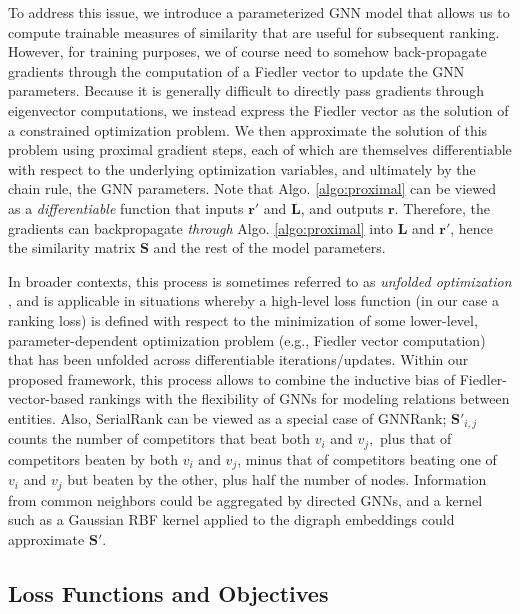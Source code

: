 \documentclass[nohyperref]{article}
\theoremstyle{plain}
\theoremstyle{definition}
\theoremstyle{remark}
\begin{document}
To address this issue, we introduce a parameterized GNN model that allows us to compute trainable measures of similarity that are useful for subsequent ranking. However, for training purposes, we of course need to somehow back-propagate gradients through the computation of a Fiedler vector to update the GNN parameters.  Because it is generally difficult to directly pass gradients through eigenvector computations, we instead express the Fiedler vector as the solution of a constrained optimization problem.  We then approximate the solution of this problem using proximal gradient steps, each of which are themselves differentiable with respect to the underlying optimization variables, and ultimately by the chain rule, the GNN parameters. Note that Algo. \ref{algo:proximal} can be viewed as a \emph{differentiable} function that inputs $\mathbf{r}'$ and $\mathbf{L}$, and outputs $\mathbf{r}$.  Therefore, the gradients can backpropagate \emph{through} Algo. \ref{algo:proximal} into 
$\mathbf{L}$ and $\mathbf{r}'$, hence the similarity matrix $\mathbf{S}$ and the rest of the model parameters.

In broader contexts, this process is sometimes referred to as \textit{unfolded optimization}  \cite{gregor2010learning}, and is applicable in situations whereby a high-level loss function (in our case a ranking loss) is defined with respect to the minimization of some lower-level, parameter-dependent optimization problem (e.g., Fiedler vector computation) that has been unfolded across differentiable iterations/updates. Within our proposed framework, this process allows to combine the inductive bias of Fiedler-vector-based rankings with the flexibility of GNNs for modeling relations between entities. Also, SerialRank can be viewed as a special case of GNNRank;
$\mathbf{S}'_{i,j}$ counts the number of competitors that beat both $v_i$ and $v_j,$ plus that of competitors beaten by both $v_i$ and $v_j$, minus that of competitors beating one of $v_i$ and $v_j$ but
beaten by the other, plus half the number of nodes. 
Information from common 
neighbors could be aggregated by directed GNNs, and a 
kernel such as a Gaussian RBF kernel applied to the digraph embeddings could approximate $\mathbf{S}'$.

\subsection{Loss Functions and Objectives}
\end{document}
